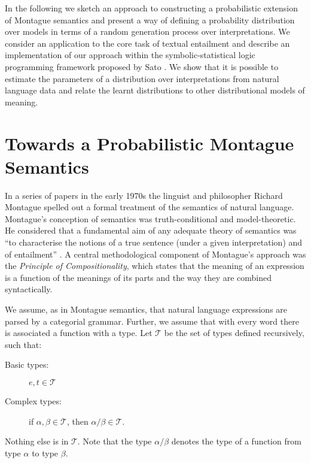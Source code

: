 \documentclass[letterpaper]{article}
\begin{document}
In the following we sketch an approach to constructing a probabilistic extension of Montague semantics and present a way of defining a probability distribution over models in terms of  a random generation process over interpretations.  We consider an application to the core task of textual entailment and describe an implementation of our approach within the symbolic-statistical logic programming framework proposed by Sato \cite{Sato:95}. We show that it is possible to estimate the parameters of a distribution over interpretations from natural language data and relate the learnt distributions to other distributional models of meaning.





\section{Towards a Probabilistic Montague Semantics}


In a series of papers in the early 1970s \cite{Montague1970a,Montague1970b,Montague1973} the linguist and philosopher Richard Montague spelled out a formal treatment of the semantics of natural language. Montague's conception of semantics was truth-conditional and model-theoretic. He considered that a fundamental aim of any adequate theory of semantics was ``to characterise the notions of a true sentence (under a given interpretation) and of entailment'' \cite{Montague1970b}. A central methodological component of Montague's approach was the {\em Principle of Compositionality\/}, which states that the meaning of an expression is a function of the meanings of its parts and the way they are combined syntactically.


We assume, as in Montague semantics, that natural language expressions
are parsed by a categorial grammar. Further, we assume that with every word there is
associated a function with a type. Let $\mathcal{T}$ be the set of types defined
recursively, such that:
\begin{description}
\item [Basic types:] $e,t\in \mathcal{T}$
\item[Complex types:]  if $\alpha, \beta\in \mathcal{T}$, then $\alpha/\beta\in \mathcal{T}$.
\end{description}
Nothing else is in $\mathcal{T}$. Note that the type $\alpha/\beta$ denotes the type of a function from type
$\alpha$ to type $\beta$.
\end{document}
